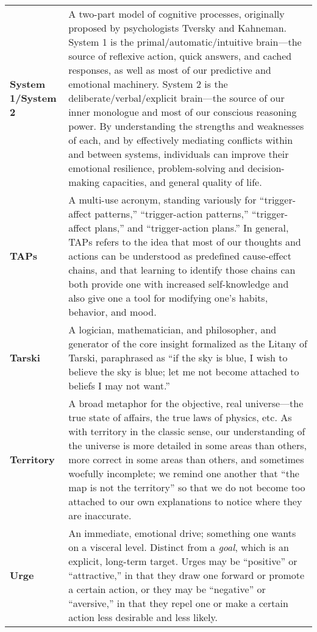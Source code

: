 \begin{longtable} { p{} p{} }
\textbf{System 1/System 2} & A two-part model of cognitive processes, originally proposed by psychologists Tversky and Kahneman.  System 1 is the primal/automatic/intuitive brain---the source of reflexive action, quick answers, and cached responses, as well as most of our predictive and emotional machinery.  System 2 is the deliberate/verbal/explicit brain---the source of our inner monologue and most of our conscious reasoning power.  By understanding the strengths and weaknesses of each, and by effectively mediating conflicts within and between systems, individuals can improve their emotional resilience, problem-solving and decision-making capacities, and general quality of life.\\

\textbf{TAPs} & A multi-use acronym, standing variously for ``trigger-affect patterns,'' ``trigger-action patterns,'' ``trigger-affect plans,'' and ``trigger-action plans.''  In general, TAPs refers to the idea that most of our thoughts and actions can be understood as predefined cause-effect chains, and that learning to identify those chains can both provide one with increased self-knowledge and also give one a tool for modifying one's habits, behavior, and mood.\\

\textbf{Tarski} & A logician, mathematician, and philosopher, and generator of the core insight formalized as the Litany of Tarski, paraphrased as ``if the sky is blue, I wish to believe the sky is blue; let me not become attached to beliefs I may not want.''\\

\textbf{Territory} & A broad metaphor for the objective, real universe---the true state of affairs, the true laws of physics, etc.  As with territory in the classic sense, our understanding of the universe is more detailed in some areas than others, more correct in some areas than others, and sometimes woefully incomplete; we remind one another that ``the map is not the territory'' so that we do not become too attached to our own explanations to notice where they are inaccurate.\\

\textbf{Urge} & An immediate, emotional drive; something one wants on a visceral level.  Distinct from a \emph{goal}, which is an explicit, long-term target.  Urges may be ``positive'' or ``attractive,'' in that they draw one forward or promote a certain action, or they may be ``negative'' or ``aversive,'' in that they repel one or make a certain action less desirable and less likely.\\


\end{longtable}
